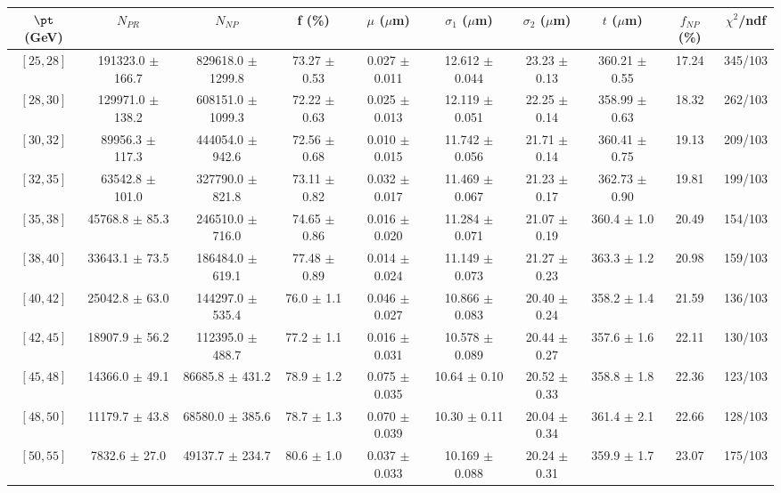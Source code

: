 \begin{tabular}{c||c|c|c|c|c|c|c||c|c}
$\pt$ (GeV) & $N_{PR}$ & $N_{NP}$ & f (\%) & $\mu$ ($\mu$m) & $\sigma_1$ ($\mu$m) & $\sigma_2$ ($\mu$m)  & $t$ ($\mu$m) & $f_{NP}$ (\%) & $\chi^2$/ndf \\
\hline
$[25, 28]$ & 191323.0 $\pm$ 166.7 & 829618.0 $\pm$ 1299.8 & 73.27 $\pm$ 0.53 & 0.027 $\pm$ 0.011 & 12.612 $\pm$ 0.044 & 23.23 $\pm$ 0.13 & 360.21 $\pm$ 0.55 & 17.24 & 345/103\\
$[28, 30]$ & 129971.0 $\pm$ 138.2 & 608151.0 $\pm$ 1099.3 & 72.22 $\pm$ 0.63 & 0.025 $\pm$ 0.013 & 12.119 $\pm$ 0.051 & 22.25 $\pm$ 0.14 & 358.99 $\pm$ 0.63 & 18.32 & 262/103\\
$[30, 32]$ & 89956.3 $\pm$ 117.3 & 444054.0 $\pm$ 942.6 & 72.56 $\pm$ 0.68 & 0.010 $\pm$ 0.015 & 11.742 $\pm$ 0.056 & 21.71 $\pm$ 0.14 & 360.41 $\pm$ 0.75 & 19.13 & 209/103\\
$[32, 35]$ & 63542.8 $\pm$ 101.0 & 327790.0 $\pm$ 821.8 & 73.11 $\pm$ 0.82 & 0.032 $\pm$ 0.017 & 11.469 $\pm$ 0.067 & 21.23 $\pm$ 0.17 & 362.73 $\pm$ 0.90 & 19.81 & 199/103\\
$[35, 38]$ & 45768.8 $\pm$ 85.3 & 246510.0 $\pm$ 716.0 & 74.65 $\pm$ 0.86 & 0.016 $\pm$ 0.020 & 11.284 $\pm$ 0.071 & 21.07 $\pm$ 0.19 & 360.4 $\pm$ 1.0 & 20.49 & 154/103\\
$[38, 40]$ & 33643.1 $\pm$ 73.5 & 186484.0 $\pm$ 619.1 & 77.48 $\pm$ 0.89 & 0.014 $\pm$ 0.024 & 11.149 $\pm$ 0.073 & 21.27 $\pm$ 0.23 & 363.3 $\pm$ 1.2 & 20.98 & 159/103\\
$[40, 42]$ & 25042.8 $\pm$ 63.0 & 144297.0 $\pm$ 535.4 & 76.0 $\pm$ 1.1 & 0.046 $\pm$ 0.027 & 10.866 $\pm$ 0.083 & 20.40 $\pm$ 0.24 & 358.2 $\pm$ 1.4 & 21.59 & 136/103\\
$[42, 45]$ & 18907.9 $\pm$ 56.2 & 112395.0 $\pm$ 488.7 & 77.2 $\pm$ 1.1 & 0.016 $\pm$ 0.031 & 10.578 $\pm$ 0.089 & 20.44 $\pm$ 0.27 & 357.6 $\pm$ 1.6 & 22.11 & 130/103\\
$[45, 48]$ & 14366.0 $\pm$ 49.1 & 86685.8 $\pm$ 431.2 & 78.9 $\pm$ 1.2 & 0.075 $\pm$ 0.035 & 10.64 $\pm$ 0.10 & 20.52 $\pm$ 0.33 & 358.8 $\pm$ 1.8 & 22.36 & 123/103\\
$[48, 50]$ & 11179.7 $\pm$ 43.8 & 68580.0 $\pm$ 385.6 & 78.7 $\pm$ 1.3 & 0.070 $\pm$ 0.039 & 10.30 $\pm$ 0.11 & 20.04 $\pm$ 0.34 & 361.4 $\pm$ 2.1 & 22.66 & 128/103\\
$[50, 55]$ & 7832.6 $\pm$ 27.0 & 49137.7 $\pm$ 234.7 & 80.6 $\pm$ 1.0 & 0.037 $\pm$ 0.033 & 10.169 $\pm$ 0.088 & 20.24 $\pm$ 0.31 & 359.9 $\pm$ 1.7 & 23.07 & 175/103\\

\end{tabular}
